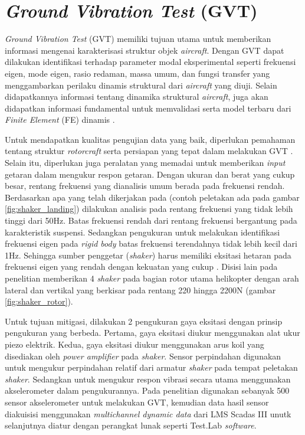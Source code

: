 \section{\textit{Ground Vibration Test} (GVT)}
\label{sec:GVT}

\textit{Ground Vibration Test} (GVT) memiliki tujuan utama untuk memberikan informasi mengenai karakterisasi struktur objek \textit{aircraft}. Dengan GVT dapat dilakukan identifikasi terhadap parameter modal eksperimental seperti frekuensi eigen, mode eigen, rasio redaman, massa umum, dan fungsi transfer yang menggambarkan perilaku dinamis struktural dari \textit{aircraft} yang diuji. Selain didapatkannya informasi tentang dinamika struktural \textit{aircraft}, juga akan didapatkan informasi fundamental untuk memvalidasi serta model terbaru dari \textit{Finite Element} (FE) dinamis \cite{Ciavarella2018AnEH}.

Untuk mendapatkan kualitas pengujian data yang baik, diperlukan pemahaman tentang struktur \textit{rotorcraft} serta persiapan yang tepat dalam melakukan GVT \cite{Ciavarella2018AnEH}. Selain itu, diperlukan juga peralatan yang memadai untuk memberikan \textit{input} getaran dalam mengukur respon getaran. Dengan ukuran dan berat yang cukup besar, rentang frekuensi yang dianalisis umum berada pada frekuensi rendah. Berdasarkan apa yang telah dikerjakan pada \cite{lubrina:hal-01059708} (contoh peletakan ada pada gambar \ref{fig:shaker_landing}) dilakukan analisis pada rentang frekuensi yang tidak lebih tinggi dari 50Hz. Batas frekuensi rendah dari rentang frekuensi bergantung pada karakteristik suspensi. Sedangkan pengukuran untuk melakukan identifikasi frekuensi eigen pada \textit{rigid body} batas frekuensi terendahnya tidak lebih kecil dari 1Hz. Sehingga sumber penggetar (\textit{shaker}) harus memiliki eksitasi hetaran pada frekuensi eigen yang rendah dengan kekuatan yang cukup \cite{lubrina:hal-01059708}. Disisi lain pada penelitian \cite{Ciavarella2018AnEH} memberikan 4 \textit{shaker} pada bagian rotor utama helikopter dengan arah lateral dan vertikal yang berkisar pada rentang 220 hingga 2200N (gambar \ref{fig:shaker_rotor}).

Untuk tujuan mitigasi, dilakukan 2 pengukuran gaya eksitasi dengan prinsip pengukuran yang berbeda. Pertama, gaya eksitasi diukur menggunakan alat ukur piezo elektrik. Kedua, gaya eksitasi diukur menggunakan arus koil yang disediakan oleh \textit{power amplifier} pada \textit{shaker}. Sensor perpindahan digunakan untuk mengukur perpindahan relatif dari armatur \textit{shaker} pada tempat peletakan \textit{shaker}. Sedangkan untuk mengukur respon vibrasi secara utama menggunakan akselerometer dalam pengukurannya. Pada penelitian \cite{lubrina:hal-01059708} digunakan sebanyak 500 sensor akselerometer untuk melakukan GVT, kemudian data hasil sensor diakuisisi menggunakan \textit{multichannel dynamic data} dari LMS Scadas III unutk selanjutnya diatur dengan perangkat lunak seperti Test.Lab \textit{software}.

